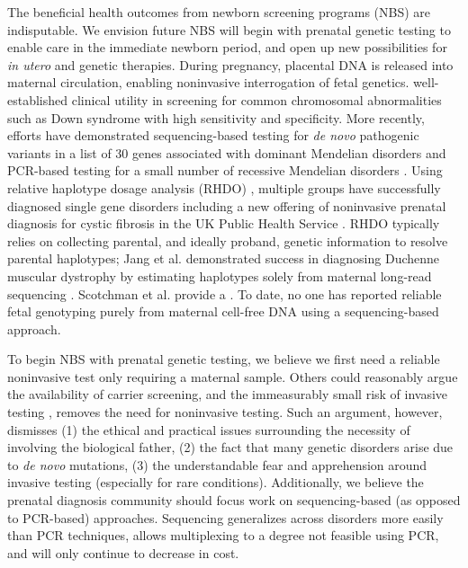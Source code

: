 \documentclass{article}\usepackage[]{graphicx}\usepackage[]{color}
\begin{document}
The beneficial health outcomes from newborn screening programs (NBS) are indisputable.
We envision future NBS will begin with prenatal genetic testing to enable care in the immediate newborn period, and open up new possibilities for \textit{in utero} and genetic therapies.
During pregnancy, placental DNA  is released into maternal circulation, enabling noninvasive interrogation of fetal genetics.
 well-established clinical utility in screening for common chromosomal abnormalities such as Down syndrome with high sensitivity and specificity\cite{mackie:2017aa}.
More recently, efforts have demonstrated sequencing-based testing for \textit{de novo} pathogenic variants in a list of 30 genes associated with dominant Mendelian disorders \cite{zhang:2019aa} and PCR-based testing for a small number of recessive Mendelian disorders \cite{tsao:2019ab}.
Using relative haplotype dosage analysis (RHDO) \cite{lo:2010aa}, multiple groups have successfully diagnosed single gene disorders \cite{hui:2017aa,vermeulen:2017aa,jang:2018aa} including a new offering of noninvasive prenatal diagnosis for cystic fibrosis in the UK Public Health Service \cite{chandler:2020aa}.
RHDO typically relies on collecting parental, and ideally proband, genetic information to resolve parental haplotypes; Jang et al. demonstrated success in diagnosing Duchenne muscular dystrophy by estimating haplotypes solely from maternal long-read sequencing \cite{jang:2018aa}.
Scotchman et al. provide a  \cite{scotchman:2020aa}.
To date, no one has reported reliable fetal genotyping purely from maternal cell-free DNA using a sequencing-based approach.

To begin NBS with prenatal genetic testing, we believe we first need a reliable noninvasive test only requiring a maternal sample.
Others could reasonably argue the availability of carrier screening, and the immeasurably small risk of invasive testing \cite{salomon:2019aa}, removes the need for noninvasive testing.
Such an argument, however, dismisses (1) the ethical and practical issues surrounding the necessity of involving the biological father, (2) the fact that many genetic disorders arise due to \textit{de novo} mutations,  (3) the understandable fear and apprehension around invasive testing (especially for rare conditions).
Additionally, we believe the prenatal diagnosis community should focus work on sequencing-based (as opposed to PCR-based) approaches.
Sequencing generalizes across disorders more easily than PCR techniques, allows multiplexing to a degree not feasible using PCR, and will only continue to decrease in cost.
\end{document}
